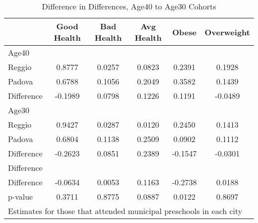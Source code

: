 \begin{table}[htbp]\centering
\caption{Difference in Differences, Age40 to Age30 Cohorts}
\begin{tabular}{l*{5}{c}}
\hline\hline
            & Good Health&  Bad Health&  Avg Health&       Obese&  Overweight\\
\hline
Age40       &            &            &            &            &            \\
Reggio      &      0.8777&      0.0257&      0.0823&      0.2391&      0.1928\\
Padova      &      0.6788&      0.1056&      0.2049&      0.3582&      0.1439\\
Difference  &     -0.1989&      0.0798&      0.1226&      0.1191&     -0.0489\\
\hline
Age30       &            &            &            &            &            \\
Reggio      &      0.9427&      0.0287&      0.0120&      0.2450&      0.1413\\
Padova      &      0.6804&      0.1138&      0.2509&      0.0902&      0.1112\\
Difference  &     -0.2623&      0.0851&      0.2389&     -0.1547&     -0.0301\\
\hline
Difference  &            &            &            &            &            \\
Difference  &     -0.0634&      0.0053&      0.1163&     -0.2738&      0.0188\\
p-value     &      0.3711&      0.8775&      0.0887&      0.0122&      0.8697\\
\hline\hline
\multicolumn{6}{l}{\footnotesize Estimates for those that attended municipal preschools in each city}\\
\end{tabular}
\end{table}
